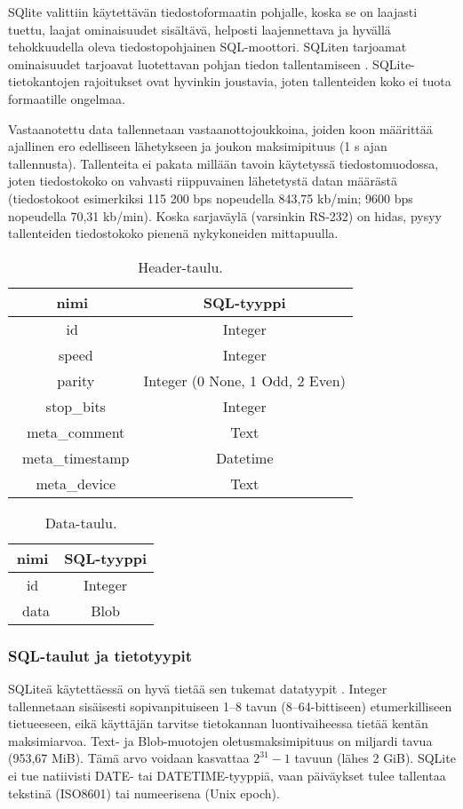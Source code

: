 SQlite valittiin käytettävän tiedostoformaatin pohjalle, koska se on laajasti tuettu, laajat ominaisuudet sisältävä, helposti laajennettava ja hyvällä tehokkuudella oleva tiedostopohjainen SQL-moottori. SQLiten tarjoamat ominaisuudet tarjoavat luotettavan pohjan tiedon tallentamiseen \cite{sqlite:appfileformat}. SQLite-tietokantojen rajoitukset ovat hyvinkin joustavia, joten tallenteiden koko ei tuota formaatille ongelmaa.

Vastaanotettu data tallennetaan vastaanottojoukkoina, joiden koon määrittää ajallinen ero edelliseen lähetykseen ja joukon maksimipituus (1 s ajan tallennusta). Tallenteita ei pakata millään tavoin käytetyssä tiedostomuodossa, joten tiedostokoko on vahvasti riippuvainen lähetetystä datan määrästä (tiedostokoot esimerkiksi 115 200 bps nopeudella 843,75 kb/min; 9600 bps nopeudella 70,31 kb/min). Koska sarjaväylä (varsinkin RS-232) on hidas, pysyy tallenteiden tiedostokoko pienenä nykykoneiden mittapuulla.

\begin{table}[h]
\centering
\vspace*{1 cm}
\caption{Header-taulu.}
\label{Header-taulu}
\begin{tabular}{ c|c }
\centering
nimi & SQL-tyyppi \\\toprule
id & Integer \\\
speed & Integer \\\
parity & Integer (0 None, 1 Odd, 2 Even) \\\
stop\_bits & Integer \\\
meta\_comment & Text \\\
meta\_timestamp & Datetime \\\
meta\_device & Text \\\bottomrule
\end{tabular}
\end{table}

\begin{table}[h]
\vspace*{1 cm}
\centering
\caption{Data-taulu.}
\label{Data-taulu}
\begin{tabular}{ c|c }
nimi & SQL-tyyppi \\\toprule
id & Integer \\\
data & Blob \\\bottomrule
\end{tabular}
\end{table}


\subsubsection{SQL-taulut ja tietotyypit}
SQLiteä käytettäessä on hyvä tietää sen tukemat datatyypit \cite{sqlite:datatype3}. Integer tallennetaan sisäisesti sopivanpituiseen 1--8 tavun (8--64-bittiseen) etumerkilliseen tietueeseen, eikä käyttäjän tarvitse tietokannan luontivaiheessa tietää kentän maksimiarvoa. Text- ja Blob-muotojen oletusmaksimipituus on miljardi tavua (953,67 MiB). Tämä arvo voidaan kasvattaa $2^{31}-1$ tavuun (lähes 2 GiB). SQLite ei tue natiivisti DATE- tai DATETIME-tyyppiä, vaan päiväykset tulee tallentaa tekstinä (ISO8601) tai numeerisena (Unix epoch).

